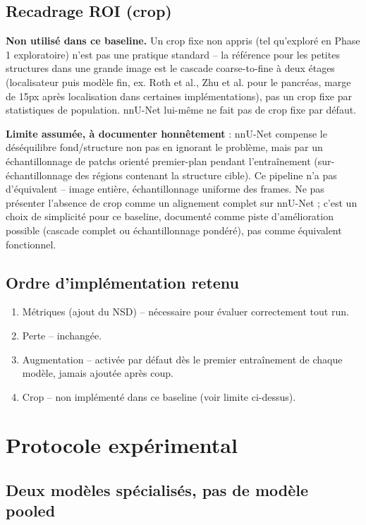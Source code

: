 \documentclass[11pt,a4paper]{report}
\begin{document}
\section{Recadrage ROI (crop)}

\textbf{Non utilisé dans ce baseline.} Un crop fixe non appris (tel qu'exploré en
Phase 1 exploratoire) n'est pas une pratique standard -- la référence pour les petites
structures dans une grande image est le cascade coarse-to-fine à deux étages
(localisateur puis modèle fin, ex. Roth et al., Zhu et al. pour le pancréas, marge de
15px après localisation dans certaines implémentations), pas un crop fixe par
statistiques de population. nnU-Net lui-même ne fait pas de crop fixe par défaut.

\textbf{Limite assumée, à documenter honnêtement} : nnU-Net compense le déséquilibre
fond/structure non pas en ignorant le problème, mais par un échantillonnage de
patchs orienté premier-plan pendant l'entraînement (sur-échantillonnage des régions
contenant la structure cible). Ce pipeline n'a pas d'équivalent -- image entière,
échantillonnage uniforme des frames. Ne pas présenter l'absence de crop comme un
alignement complet sur nnU-Net ; c'est un choix de simplicité pour ce baseline,
documenté comme piste d'amélioration possible (cascade complet ou échantillonnage
pondéré), pas comme équivalent fonctionnel.

\section{Ordre d'implémentation retenu}

\begin{enumerate}[nosep]
    \item Métriques (ajout du NSD) -- nécessaire pour évaluer correctement tout run.
    \item Perte -- inchangée.
    \item Augmentation -- activée par défaut dès le premier entraînement de chaque
        modèle, jamais ajoutée après coup.
    \item Crop -- non implémenté dans ce baseline (voir limite ci-dessus).
\end{enumerate}

\chapter{Protocole expérimental}

\section{Deux modèles spécialisés, pas de modèle pooled}
\end{document}
